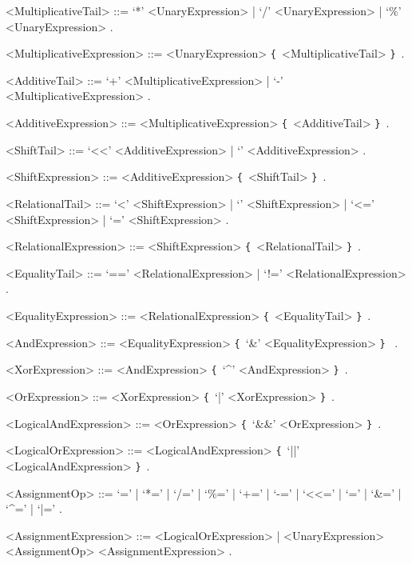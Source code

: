 \documentclass{article}
\def\lrep{\synshortsoff\texttt{\{}\synshorts~}
\def\rrep{\synshortsoff\texttt{\}}\synshorts~}
\begin{document}

\begin{grammar}
  <MultiplicativeTail> ::= `*' <UnaryExpression> | `/' <UnaryExpression> | `\%'
  <UnaryExpression> .
  
  <MultiplicativeExpression> ::= <UnaryExpression> \lrep <MultiplicativeTail>
  \rrep .

  <AdditiveTail> ::= `+' <MultiplicativeExpression> | `-'
  <MultiplicativeExpression> .

  <AdditiveExpression> ::= <MultiplicativeExpression> \lrep <AdditiveTail> \rrep .

  <ShiftTail> ::= `<<' <AdditiveExpression> | `\>\>' <AdditiveExpression> .
  
  <ShiftExpression> ::= <AdditiveExpression> \lrep <ShiftTail> \rrep .

  <RelationalTail> ::= `<' <ShiftExpression> | `\>' <ShiftExpression> | `<='
  <ShiftExpression> | `\>=' <ShiftExpression> .
  
  <RelationalExpression> ::= <ShiftExpression> \lrep <RelationalTail> \rrep .

  <EqualityTail> ::= `==' <RelationalExpression> | `!=' <RelationalExpression> .
  
  <EqualityExpression> ::= <RelationalExpression> \lrep <EqualityTail> \rrep .

  <AndExpression> ::= <EqualityExpression> \lrep `&' <EqualityExpression> \rrep
  .

  <XorExpression> ::= <AndExpression> \lrep `^' <AndExpression> \rrep .

  <OrExpression> ::= <XorExpression> \lrep `|' <XorExpression> \rrep .

  <LogicalAndExpression> ::= <OrExpression> \lrep `&&' <OrExpression> \rrep .

  <LogicalOrExpression> ::= <LogicalAndExpression> \lrep `||'
  <LogicalAndExpression> \rrep .


  <AssignmentOp> ::= `=' | `*=' | `/=' | `\%=' | `+=' | `-=' | `<<=' | `\>\>='
  | `&=' | `^=' | `|=' .
  
  <AssignmentExpression> ::= <LogicalOrExpression> | <UnaryExpression>
  <AssignmentOp> <AssignmentExpression> .
\end{grammar}
\end{document}

